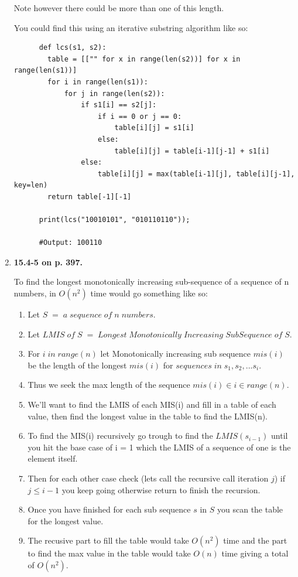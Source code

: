 \documentclass{article}
\begin{document}
\begin{enumerate}
    Note however there could be more than one of this length.

    You could find this using an iterative substring algorithm like so:

    \begin{lstlisting}
      def lcs(s1, s2):
        table = [["" for x in range(len(s2))] for x in range(len(s1))]
        for i in range(len(s1)):
            for j in range(len(s2)):
                if s1[i] == s2[j]:
                    if i == 0 or j == 0:
                        table[i][j] = s1[i]
                    else:
                        table[i][j] = table[i-1][j-1] + s1[i]
                else:
                    table[i][j] = max(table[i-1][j], table[i][j-1], key=len)
        return table[-1][-1]

      print(lcs("10010101", "010110110"));

      #Output: 100110
    \end{lstlisting}

    \item \textbf{15.4-5 on p. 397.}
    
    To find the longest monotonically increasing sub-sequence of a sequence of n numbers, in $O(n^2)$ time would go something like so:

    \begin{enumerate}
      \item Let $S\;=\;a\;sequence\;of\;n\;numbers$.
      \item Let $LMIS\;of\;S\;=\;Longest\;Monotonically\;Increasing\;Sub Sequence\;of\;S$.
      \item For $i\;in\;range(n)$ let Monotonically increasing sub sequence $mis(i)$ be the length of the longest $mis(i)$ for $sequence s\;in\;s_1, s_2, ... s_i$.
      \item Thus we seek the max length of the sequence $mis(i) \in i \in range(n)$.
      \item We'll want to find the LMIS of each MIS(i) and fill in a table of each value, then find the longest value in the table to find the LMIS(n).
      \item To find the MIS(i) recursively go trough to find the $LMIS(s_{i - 1})$ until you hit the base case of i = 1 which the LMIS of a sequence of one is the element itself. 
      \item Then for each other case check (lets call the recursive call iteration $j$) if $j \leq i -1$ you keep going otherwise return to finish the recursion. 
      \item Once you have finished for each sub sequence $s$ in $S$ you scan the table for the longest value.
      \item The recusive part to fill the table would take $O(n^2)$ time and the part to find the max value in the table would take $O(n)$ time giving a total of $O(n^2)$.
    \end{enumerate}


\end{enumerate}
\end{document}
